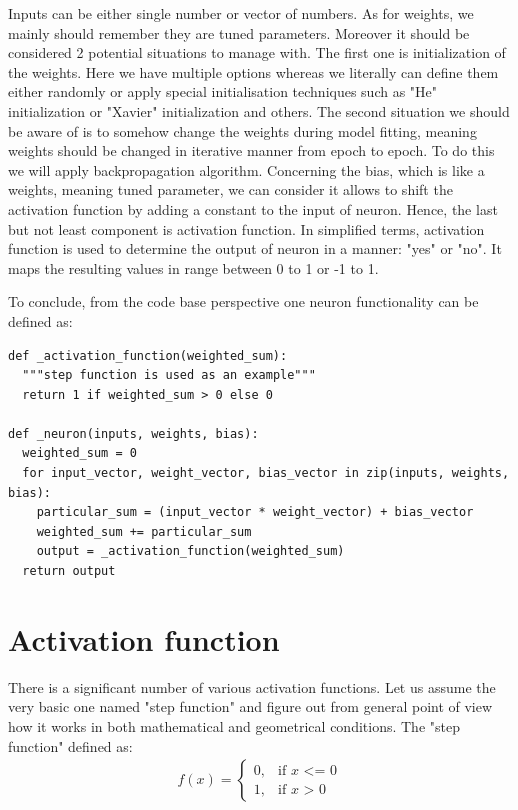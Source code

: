 \documentclass{article}
\begin{document}
Inputs can be either single number or vector of numbers. As for weights, we mainly should remember they are tuned parameters. Moreover it should be considered 2 potential situations to manage with. The first one is initialization of the weights. Here we have multiple options whereas we literally can define them either randomly or apply special initialisation techniques such as "He" initialization or "Xavier" initialization and others. The second situation we should be aware of is to somehow change the weights during model fitting, meaning weights should be changed in iterative manner from epoch to epoch. To do this we will apply backpropagation algorithm. Concerning the bias, which is like a weights, meaning tuned parameter, we can consider it allows to shift the activation function by adding a constant to the input of neuron. Hence, the last but not least component is activation function. In simplified terms, activation function is used to determine the output of neuron in a manner: "yes" or "no". It maps the resulting values in range between 0 to 1 or -1 to 1.            

To conclude, from the code base perspective one neuron functionality can be defined as:
\begin{lstlisting}
def _activation_function(weighted_sum):
  """step function is used as an example"""
  return 1 if weighted_sum > 0 else 0

def _neuron(inputs, weights, bias):
  weighted_sum = 0
  for input_vector, weight_vector, bias_vector in zip(inputs, weights, bias):
    particular_sum = (input_vector * weight_vector) + bias_vector
    weighted_sum += particular_sum
    output = _activation_function(weighted_sum)
  return output
\end{lstlisting}

      
\section{Activation function}
There is a significant number of various activation functions. Let us assume the very basic one named "step function" and figure out from general point of view how it works in both mathematical and geometrical conditions.   
The "step function" defined as:
\begin{align*}
f(x) = \begin{cases} 0, & \mbox{if } x\mbox{ <= 0} \\ 1, & \mbox{if } x\mbox{ > 0} \end{cases}
\end{align*}
\end{document}
